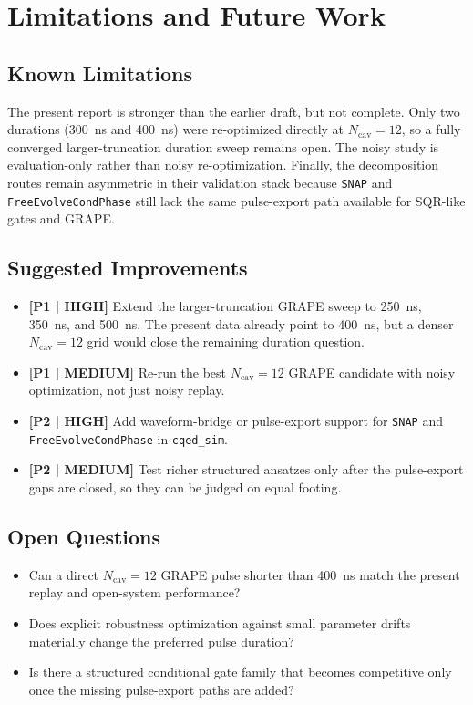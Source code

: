 \documentclass[aps,pra,twocolumn,reprint,amsmath,amssymb]{revtex4-2}
\begin{document}
\section{Limitations and Future Work}
\subsection{Known Limitations}
The present report is stronger than the earlier draft, but not complete.
Only two durations (\SI{300}{ns} and \SI{400}{ns}) were re-optimized directly
at $N_{\mathrm{cav}}=12$, so a fully converged larger-truncation duration sweep
remains open. The noisy study is evaluation-only rather than noisy
re-optimization. Finally, the decomposition routes remain asymmetric in their
validation stack because \texttt{SNAP} and \texttt{FreeEvolveCondPhase} still
lack the same pulse-export path available for SQR-like gates and GRAPE.

\subsection{Suggested Improvements}
\begin{itemize}
  \item \textbf{[P1 | HIGH]} Extend the larger-truncation GRAPE sweep to
  \SI{250}{ns}, \SI{350}{ns}, and \SI{500}{ns}. The present data already point
  to \SI{400}{ns}, but a denser $N_{\mathrm{cav}}=12$ grid would close the
  remaining duration question.
  \item \textbf{[P1 | MEDIUM]} Re-run the best $N_{\mathrm{cav}}=12$ GRAPE
  candidate with noisy optimization, not just noisy replay.
  \item \textbf{[P2 | HIGH]} Add waveform-bridge or pulse-export support for
  \texttt{SNAP} and \texttt{FreeEvolveCondPhase} in \texttt{cqed\_sim}.
  \item \textbf{[P2 | MEDIUM]} Test richer structured ansatzes only after the
  pulse-export gaps are closed, so they can be judged on equal footing.
\end{itemize}

\subsection{Open Questions}
\begin{itemize}
  \item Can a direct $N_{\mathrm{cav}}=12$ GRAPE pulse shorter than
  \SI{400}{ns} match the present replay and open-system performance?
  \item Does explicit robustness optimization against small parameter drifts
  materially change the preferred pulse duration?
  \item Is there a structured conditional gate family that becomes competitive
  only once the missing pulse-export paths are added?
\end{itemize}
\end{document}
